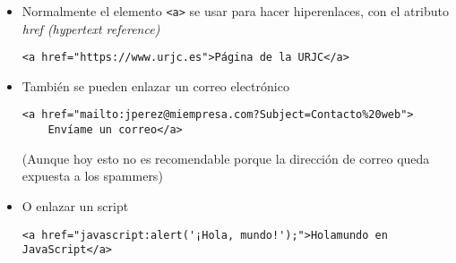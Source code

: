\documentclass[ucs]{beamer}
\begin{document}
\begin{frame}[fragile]
\frametitle{}
\begin{itemize}
\item
Normalmente el elemento 
\verb|<a>| 
se usar para hacer hiperenlaces, con el atributo
\emph{href (hypertext reference)}


  \begin{footnotesize}
  \begin{verbatim}
<a href="https://www.urjc.es">Página de la URJC</a>
  \end{verbatim}
  \end{footnotesize}

\item

También se pueden enlazar un correo electrónico

  \begin{scriptsize}
  \begin{verbatim}
<a href="mailto:jperez@miempresa.com?Subject=Contacto%20web">
    Envíame un correo</a>
  \end{verbatim}
  \end{scriptsize}


(Aunque hoy esto no es recomendable porque la dirección de correo queda expuesta a los spammers)

\item
O enlazar un script

  \begin{scriptsize}
  \begin{verbatim}
<a href="javascript:alert('¡Hola, mundo!');">Holamundo en JavaScript</a>
  \end{verbatim}
  \end{scriptsize}

\end{itemize}
\end{frame}
\end{document}

